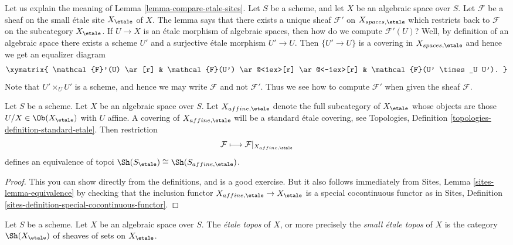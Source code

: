 \begin{remark}
\label{remark-explain-equivalence}
Let us explain the meaning of Lemma \ref{lemma-compare-etale-sites}.
Let $S$ be a scheme, and let $X$ be an algebraic space over $S$.
Let $\mathcal{F}$ be a sheaf on the small \'etale site $X_\etale$ of
$X$. The lemma says that there exists a unique sheaf $\mathcal{F}'$ on
$X_{spaces, \etale}$ which restricts back to $\mathcal{F}$ on the
subcategory $X_\etale$. If $U \to X$ is an \'etale morphism of
algebraic spaces, then how do we compute $\mathcal{F}'(U)$? Well, by definition
of an algebraic space there exists a scheme $U'$ and a surjective
\'etale morphism $U' \to U$. Then $\{U' \to U\}$ is a covering in
$X_{spaces, \etale}$ and hence we get an equalizer diagram
$$
\xymatrix{
\mathcal{F}'(U) \ar[r] &
\mathcal{F}(U') \ar@<1ex>[r] \ar@<-1ex>[r] &
\mathcal{F}(U' \times_U U').
}
$$
Note that $U' \times_U U'$ is a scheme, and hence we may
write $\mathcal{F}$ and not $\mathcal{F}'$.
Thus we see how to compute $\mathcal{F}'$
when given the sheaf $\mathcal{F}$.
\end{remark}

\begin{lemma}
\label{lemma-alternative}
Let $S$ be a scheme.
Let $X$ be an algebraic space over $S$.
Let $X_{affine, \etale}$ denote the full subcategory of
$X_\etale$ whose objects are those
$U/X \in \Ob(X_\etale)$ with $U$ affine.
A covering of $X_{affine, \etale}$ will be a
standard \'etale covering, see
Topologies, Definition \ref{topologies-definition-standard-etale}.
Then restriction
$$
\mathcal{F} \longmapsto \mathcal{F}|_{X_{affine, \etale}}
$$
defines an equivalence of topoi
$\Sh(S_\etale) \cong \Sh(S_{affine, \etale})$.
\end{lemma}

\begin{proof}
This you can show directly from the definitions, and is a good exercise.
But it also follows immediately from
Sites, Lemma \ref{sites-lemma-equivalence}
by checking that the inclusion functor
$X_{affine, \etale} \to X_\etale$ is a special cocontinuous
functor as in
Sites, Definition \ref{sites-definition-special-cocontinuous-functor}.
\end{proof}

\begin{definition}
\label{definition-etale-topos}
Let $S$ be a scheme. Let $X$ be an algebraic space over $S$.
The {\it \'etale topos} of $X$, or more precisely the
{\it small \'etale topos} of $X$ is the category
$\Sh(X_\etale)$
of sheaves of sets on $X_\etale$.
\end{definition}

